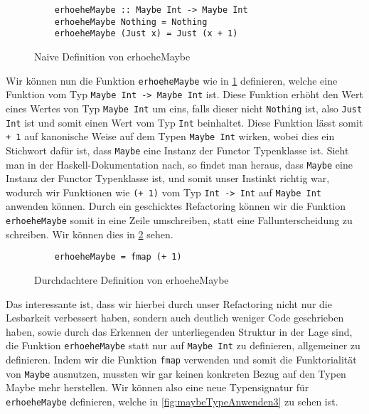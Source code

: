 \documentclass{hhuarticle}
\theoremstyle{definition}
\theoremstyle{theorem}
\begin{document}
  \begin{figure}[h]
    \begin{verbatim}
    erhoeheMaybe :: Maybe Int -> Maybe Int
    erhoeheMaybe Nothing = Nothing
    erhoeheMaybe (Just x) = Just (x + 1)
    \end{verbatim}
    \caption{Naive Definition von \glqq erhoeheMaybe\grqq }%
    \label{fig:maybeTypeAnwenden1}
  \end{figure}

  Wir können nun die Funktion \verb|erhoeheMaybe| wie in \cref{fig:maybeTypeAnwenden1} definieren, welche
  eine Funktion vom Typ \verb|Maybe Int -> Maybe Int| ist. Diese
  Funktion erhöht den Wert eines Wertes von Typ \verb|Maybe Int| um eins, falls
  dieser nicht \verb|Nothing| ist, also \verb|Just Int| ist und somit
  einen Wert vom Typ \verb|Int| beinhaltet.
  Diese Funktion lässt somit \verb|+ 1| auf kanonische Weise
  auf dem Typen \verb|Maybe Int| wirken, wobei dies ein Stichwort
  dafür ist, dass \verb|Maybe| eine Instanz der Functor
  Typenklasse ist. Sieht man in der Haskell-Dokumentation nach, so findet
  man heraus, dass \verb|Maybe| eine Instanz der Functor Typenklasse ist,
  und somit unser Instinkt richtig war, wodurch wir Funktionen wie \verb|(+ 1)|
  vom Typ \verb|Int -> Int| auf \verb|Maybe Int| anwenden können.
  Durch ein geschicktes Refactoring können wir die Funktion
  \verb|erhoeheMaybe| somit in eine Zeile umschreiben, statt eine
  Fallunterscheidung zu schreiben. Wir können dies in \cref{fig:maybeTypeAnwenden2}
  sehen.

  \begin{figure}[h]
    \begin{verbatim}
    erhoeheMaybe = fmap (+ 1)
    \end{verbatim}
    \caption{Durchdachtere Definition von \glqq erhoeheMaybe\grqq }%
    \label{fig:maybeTypeAnwenden2}
  \end{figure}

  Das interessante ist, dass wir hierbei durch unser Refactoring nicht
  nur die Lesbarkeit verbessert haben, sondern auch deutlich weniger
  Code geschrieben haben, sowie durch das Erkennen der unterliegenden
  Struktur in der Lage sind, die Funktion \verb|erhoeheMaybe| statt
  nur auf \verb|Maybe Int| zu definieren, allgemeiner zu definieren.
  Indem wir die Funktion \verb|fmap| verwenden und somit die Funktorialität
  von \verb|Maybe| ausnutzen, mussten wir gar keinen konkreten Bezug auf
  den Typen Maybe mehr herstellen. Wir können also eine neue Typensignatur
  für \verb|erhoeheMaybe| definieren, welche in \cref{fig:maybeTypeAnwenden3}
  zu sehen ist.
\end{document}
